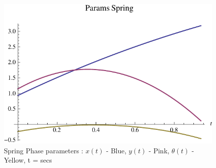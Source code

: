 \begin{figure}[!htp]
\centering
\includegraphics[scale=1]{fig/pSpringParamsG.pdf}
\caption{Spring Phase parameters : $x(t)$ - Blue, $y(t)$ - Pink, $\theta(t)$ - Yellow, t = secs}
\label{fig:4_spring_paramsG}
\end{figure}

